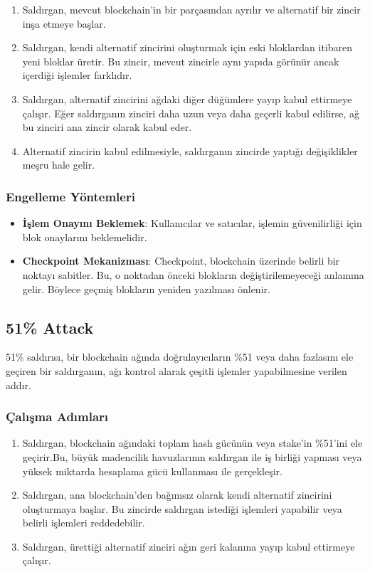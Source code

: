 \begin{enumerate}
    \item Saldırgan, mevcut blockchain’in bir parçasından ayrılır ve alternatif bir zincir inşa etmeye başlar.
    \item Saldırgan, kendi alternatif zincirini oluşturmak için eski bloklardan itibaren yeni bloklar üretir. Bu zincir, mevcut zincirle aynı yapıda görünür ancak içerdiği işlemler farklıdır.
    \item Saldırgan, alternatif zincirini ağdaki diğer düğümlere yayıp kabul ettirmeye çalışır. Eğer saldırganın zinciri daha uzun veya daha geçerli kabul edilirse, ağ bu zinciri ana zincir olarak kabul eder.
    \item Alternatif zincirin kabul edilmesiyle, saldırganın zincirde yaptığı değişiklikler meşru hale gelir.
\end{enumerate}

\subsubsection{Engelleme Yöntemleri}

\begin{itemize}
    \item \textbf{İşlem Onayını Beklemek}: Kullanıcılar ve satıcılar, işlemin güvenilirliği için blok onaylarını beklemelidir.
    \item \textbf{Checkpoint Mekanizması}: Checkpoint, blockchain üzerinde belirli bir noktayı sabitler. Bu, o noktadan önceki blokların değiştirilemeyeceği anlamına gelir. Böylece geçmiş blokların yeniden yazılması önlenir.
\end{itemize}

\newpage

\subsection{51\% Attack}

51\% saldırısı, bir blockchain ağında doğrulayıcıların \%51 veya daha fazlasını ele geçiren bir saldırganın, ağı kontrol alarak çeşitli işlemler yapabilmesine verilen addır. 

\subsubsection{Çalışma Adımları}

\begin{enumerate}
    \item Saldırgan, blockchain ağındaki toplam hash gücünün veya stake'in \%51'ini ele geçirir.Bu, büyük madencilik havuzlarının saldırgan ile iş birliği yapması veya yüksek miktarda hesaplama gücü kullanması ile gerçekleşir.
    \item Saldırgan, ana blockchain’den bağımsız olarak kendi alternatif zincirini oluşturmaya başlar. Bu zincirde saldırgan istediği işlemleri yapabilir veya belirli işlemleri reddedebilir.
    \item Saldırgan, ürettiği alternatif zinciri ağın geri kalanına yayıp kabul ettirmeye çalışır.
\end{enumerate}

